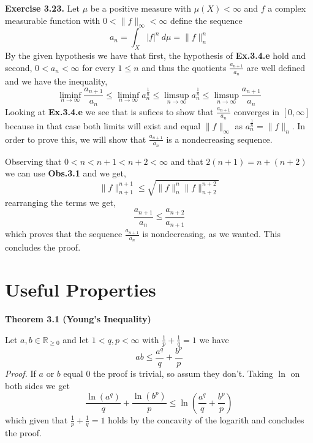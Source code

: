 \documentclass{article}
\begin{document}
\begin{exercise}\textbf{Exercise 3.23.}
    Let $\mu$ be a positive measure with $\mu \left( X \right) < \infty$ and $f$ a complex measurable function with $0 < \|f\|_\infty < \infty $ define the sequence
    \[
        a_n = \int_X |f|^n\: d\mu  = \|f\|_n^n
    \]
    By the given hypothesis we have that first, the hypothesis of \textbf{Ex.3.4.e} hold and second, $0 < a_n < \infty$ for every $ 1 \le n$ and thus the quotients $\frac{a_{n+1}}{a_n}$ are well defined and we have the inequality,
    \[
        \liminf_{n \to \infty} \frac{a_{n+1}}{a_n} \le \liminf_{n \to \infty}a_n^{\frac{1}{n}} \le \limsup_{n \to \infty} a_n^{\frac{1}{n}} \le \limsup_{n \to \infty} \frac{a_{n+1}}{a_n}
    \]
    Looking at \textbf{Ex.3.4.e} we see that is sufices to show that $\frac{a_{n+1}}{a_n}$ converges in $[0,\infty]$ because in that case both limits will exist and equal $\|f\|_\infty $ as $a_n^{\frac{1}{n}} = \|f\|_n$. In order to prove this, we will show that $\frac{a_{n+1}}{a_n}$ is a nondecreasing sequence.

    Observing that $0 < n < n+1 < n+2 < \infty$ and that $2 \left( n+1 \right) = n + \left( n+2 \right) $ we can use \textbf{Obs.3.1} and we get,
    \[
        \|f\|_{n+1}^{n+1} \le \sqrt{\|f\|_n^n \|f\|_{n+2}^{n+2}}  
    \]
    rearranging the terms we get,
    \[
        \frac{a_{n+1}}{a_n} \le \frac{a_{n+2}}{a_{n+1}}
    \]
    which proves that the sequence $\frac{a_{n+1}}{a_n}$ is nondecreasing, as we wanted. This concludes the proof.
\end{exercise}

\section*{Useful Properties}

\begin{theorem}\textbf{Theorem 3.1 (Young's Inequality)}

    Let $a,b \in \mathbb{R}_{ \ge 0}$ and let $1 < q,p < \infty$ with $\frac{1}{p}+\frac{1}{q}=1$ we have
    \[
        ab \le \frac{a^q}{q} + \frac{b^p}{p}
    \]
    \textit{Proof.} If $a$ or $b$ equal $0$ the proof is trivial, so assum they don't. Taking $\ln$ on both sides we get
    \[
        \frac{\ln \left( a^q \right) }{q} + \frac{\ln \left( b^p \right) }{p} \le \ln \left( \frac{a^q}{q} + \frac{b^p}{p} \right) 
    \]
    which given that $\frac{1}{p} + \frac{1}{q} = 1$ holds by the concavity of the logarith and concludes the proof.
\end{theorem}
\end{document}
